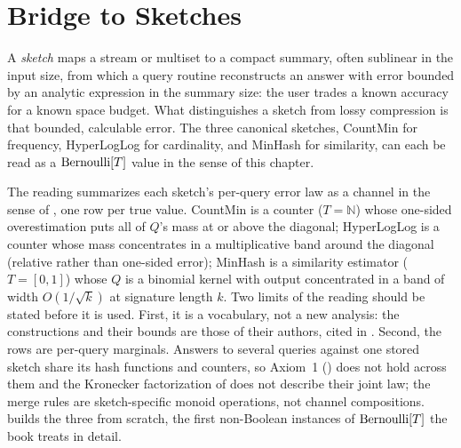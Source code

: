 %

\section{Bridge to Sketches}
\label{sec:bridge-to-sketches}

A \emph{sketch} maps a stream or multiset to a compact summary,
often sublinear in the input size, from which a query routine reconstructs an
answer with error bounded by an analytic expression in the summary size: the
user trades a known accuracy for a known space
budget. What distinguishes a
sketch from lossy compression is that bounded, calculable error. The three
canonical sketches, CountMin for frequency, HyperLogLog for cardinality, and
MinHash for similarity, can each be read as a $\mathrm{Bernoulli}[T]$ value in the sense
of this chapter.

The reading summarizes each sketch's per-query error law as a channel in the
sense of , one row per true value. CountMin is a counter
($T = \mathbb{N}$) whose one-sided overestimation puts all of $Q$'s mass at or
above the diagonal; HyperLogLog is a counter whose mass concentrates in a
multiplicative band around the diagonal (relative rather than one-sided error);
MinHash is a similarity estimator ($T = [0,1]$) whose $Q$ is a binomial kernel
with output concentrated in a band of width $O(1/\sqrt{k})$ at signature length
$k$. Two limits of the reading should be stated before it is used. First, it is
a vocabulary, not a new analysis: the constructions and their bounds are those
of their authors, cited in . Second, the rows are
per-query marginals. Answers to several queries against one stored sketch share
its hash functions and counters, so Axiom~1 () does not
hold across them and the Kronecker factorization of 
does not describe their joint law; the merge rules are sketch-specific monoid
operations, not channel compositions.  builds the
three from scratch, the first non-Boolean instances of $\mathrm{Bernoulli}[T]$ the book
treats in detail.
